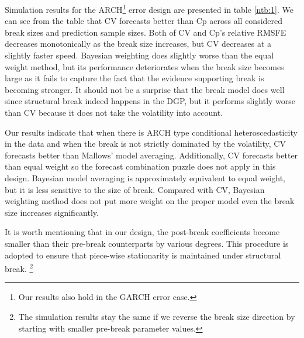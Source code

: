 Simulation results for the ARCH\footnote{Our results also hold in the GARCH error case.} error design are presented in table \ref{ntb:1}. We can see from the table that CV forecasts better than Cp across all considered break sizes and prediction sample sizes. Both of CV and Cp's relative RMSFE decreases monotonically as the break size increases, but CV decreases at a slightly faster speed. Bayesian weighting does slightly worse than the equal weight method, but its performance deteriorates when the break size becomes large as it fails to capture the fact that the evidence supporting break is becoming stronger. It should not be a surprise that the break model does well since structural break indeed happens in the DGP, but it performs slightly worse than CV because it does not take the volatility into account.

Our results indicate that when there is ARCH type conditional heteroscedasticity in the data and when the break is not strictly dominated by the volatility, CV forecasts better than Mallows' model averaging. Additionally, CV forecasts better than equal weight so the forecast combination puzzle does not apply in this design. Bayesian model averaging is approximately equivalent to equal weight, but it is less sensitive to the size of break. Compared with CV, Bayesian weighting method does not put more weight on the proper model even the break size increases significantly.

It is worth mentioning that in our design, the post-break coefficients become smaller than their pre-break counterparts by various degrees. This procedure is adopted to ensure that piece-wise stationarity is maintained under structural break. \footnote{The simulation results stay the same if we reverse the break size direction by starting with smaller pre-break parameter values.}
